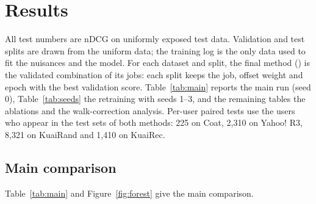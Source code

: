 \sloppy
\section{Results}\label{sec:results}

All test numbers are nDCG on uniformly exposed test data. Validation and test splits are drawn from the
uniform data; the training log is the only data used to fit the nuisances and the model. For each
dataset and split, the final method (\qp) is the validated combination of its jobs: each split keeps the
job, offset weight and epoch with the best validation score. Table~\ref{tab:main} reports the main run
(seed 0), Table~\ref{tab:seeds} the retraining with seeds 1--3, and the remaining tables the ablations
and the walk-correction analysis. Per-user paired tests use the users who appear in the test sets of
both methods: 225 on Coat, 2{,}310 on Yahoo! R3, 8{,}321 on KuaiRand and 1{,}410 on KuaiRec.

\subsection{Main comparison}\label{sec:main}

Table~\ref{tab:main} and Figure~\ref{fig:forest} give the main comparison.


